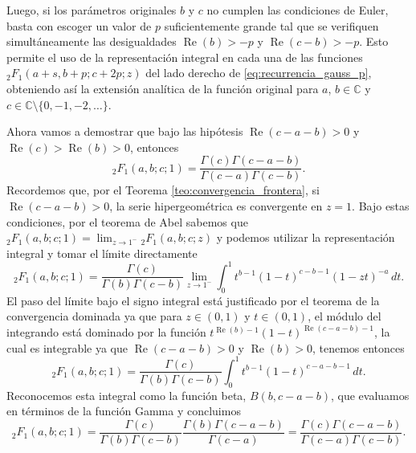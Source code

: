 \documentclass[12pt,a4paper]{book}
\renewcommand{\Re}{\operatorname{Re}}
\begin{document}
Luego, si los parámetros originales $b$ y $c$ no cumplen las condiciones de Euler, basta con escoger un valor de $p$ suficientemente grande tal que se verifiquen simultáneamente las desigualdades $\Re(b) > -p$ y $\Re(c-b) > -p$. Esto permite el uso de la representación integral en cada una de las funciones ${}_{2}F_{1}(a+s,b+p;c+2p;z)$ del lado derecho de \eqref{eq:recurrencia_gauss_p}, obteniendo así la extensión analítica de la función original para $a$, $b \in \mathbb{C}$ y $c \in \mathbb{C} \setminus \{0,-1,-2,\dots\}$.

Ahora vamos a demostrar que bajo las hipótesis $\Re(c - a - b) > 0$ y $\Re(c) > \Re(b) > 0$, entonces
\begin{equation*}
    {}_{2}F_{1}(a, b; c; 1) = \frac{\Gamma(c)\Gamma(c - a - b)}{\Gamma(c - a)\Gamma(c - b)}.
\end{equation*}
Recordemos que, por el Teorema \ref{teo:convergencia_frontera}, si $\Re(c-a-b)>0$, la serie hipergeométrica es convergente en $z=1$. Bajo estas condiciones, por el teorema de Abel sabemos que ${}_{2}F_{1}(a, b; c; 1) = \lim_{z \to 1^{-}} {}_{2}F_{1}(a, b; c; z)$ y podemos utilizar la representación integral y tomar el límite directamente
\[
{}_{2}F_{1}(a, b; c; 1) = \frac{\Gamma(c)}{\Gamma(b)\Gamma(c - b)} \lim_{z \to 1^{-}} \int_0^1 t^{b-1}(1 - t)^{c - b - 1}(1 - zt)^{-a} \, dt.
\]
El paso del límite bajo el signo integral está justificado por el teorema de la convergencia dominada ya que para $z \in (0,1)$ y $t \in (0,1)$, el módulo del integrando está dominado por la función $t^{\Re(b)-1}(1 - t)^{\Re(c - a - b) - 1}$, la cual es integrable ya que $\Re(c - a - b) > 0$ y $\Re(b)>0$, tenemos entonces
\[
    {}_{2}F_{1}(a, b; c; 1) = \frac{\Gamma(c)}{\Gamma(b)\Gamma(c - b)} \int_0^1 t^{b-1}(1 - t)^{c - a - b - 1} \, dt.
\]
Reconocemos esta integral como la función beta, $B(b, c - a - b)$, que evaluamos en términos de la función Gamma y concluimos
\begin{equation}
    \label{eq:gauss_1}
        {}_{2}F_{1}(a, b; c; 1) =
        \frac{\Gamma(c)}{\Gamma(b)\Gamma(c - b)} \frac{\Gamma(b)\Gamma(c - a - b)}{\Gamma(c - a)} 
        = \frac{\Gamma(c)\Gamma(c - a - b)}{\Gamma(c - a)\Gamma(c - b)}.
\end{equation}
\end{document}
